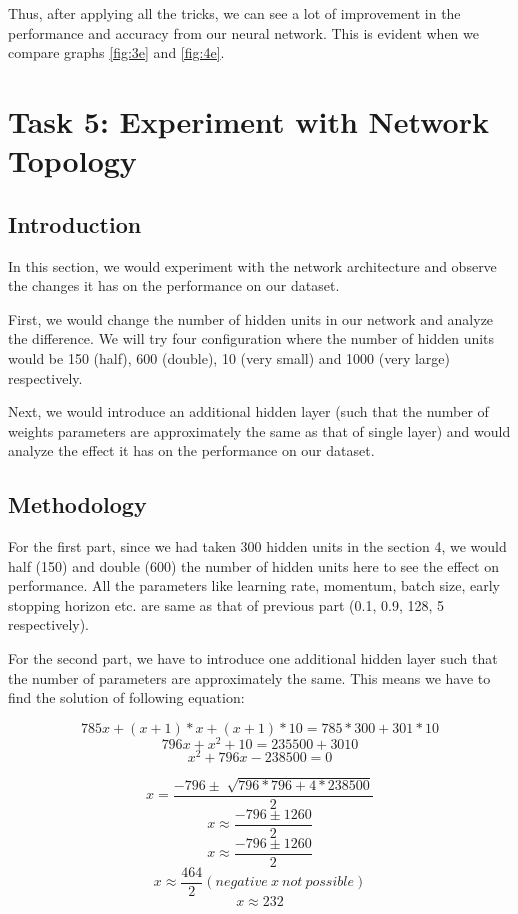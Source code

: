 \documentclass{article}
\begin{document}
Thus, after applying all the tricks, we can see a lot of improvement in the performance and accuracy from our neural network. This is evident when we compare graphs \ref{fig:3e} and \ref{fig:4e}.

\newpage
\section{Task 5: Experiment with Network Topology}

\subsection{Introduction}

In this section, we would experiment with the network architecture and observe the changes it has on the performance on our dataset.

First, we would change the number of hidden units in our network and analyze the difference. We will try four configuration where the number of hidden units would be 150 (half), 600 (double), 10 (very small) and 1000 (very large) respectively.

Next, we would introduce an additional hidden layer (such that the number of weights parameters are approximately the same as that of single layer) and would analyze the effect it has on the performance on our dataset.

\subsection{Methodology}

For the first part, since we had taken 300 hidden units in the section 4, we would half (150) and double (600) the number of hidden units here to see the effect on performance. All the parameters like learning rate, momentum, batch size, early stopping horizon etc. are same as that of previous part (0.1, 0.9, 128, 5 respectively).

For the second part, we have to introduce one additional hidden layer such that the number of parameters are approximately the same. This means we have to find the solution of following equation:

$$785x + (x+1)*{x}  + (x+1)*10 = 785*300 + 301*10$$
$$796x + x^2 + 10 = 235500 + 3010$$
$$x^2 + 796x - 238500 = 0$$

$$x = \frac{-796 \pm \sqrt[]{796*796 + 4*238500}}{2}$$
$$x  \approx \frac{-796 \pm 1260}{2}$$
$$x  \approx \frac{-796 \pm 1260}{2}$$
$$x  \approx \frac{464}{2} (negative \: x \: not \: possible)$$
$$x  \approx 232$$
\end{document}
